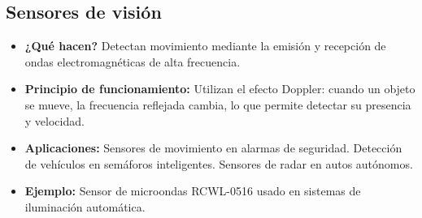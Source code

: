 \subsection*{Sensores de visión}
\begin{itemize}
	\item \textbf{¿Qué hacen?} Detectan movimiento mediante la emisión y recepción de ondas electromagnéticas de alta frecuencia.
	\item \textbf{Principio de funcionamiento:} Utilizan el efecto Doppler: cuando un objeto se mueve, la frecuencia reflejada cambia, lo que permite detectar su presencia y velocidad.
	\item \textbf{Aplicaciones:} Sensores de movimiento en alarmas de seguridad.
	Detección de vehículos en semáforos inteligentes.
	Sensores de radar en autos autónomos.
	\item \textbf{Ejemplo:} Sensor de microondas RCWL-0516 usado en sistemas de iluminación automática.
\end{itemize}

